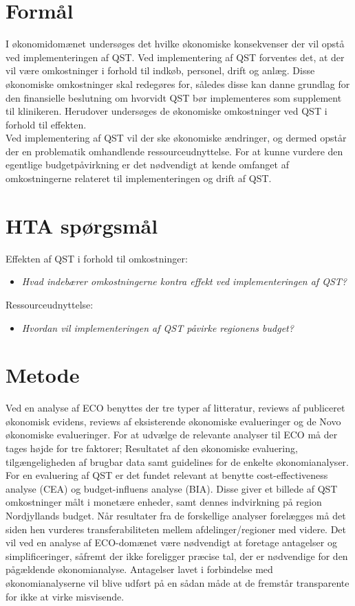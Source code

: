 \section{Formål}
I økonomidomænet undersøges det hvilke økonomiske konsekvenser der vil opstå ved implementeringen af QST. Ved implementering af QST forventes det, at der vil være omkostninger i forhold til indkøb, personel, drift og anlæg. Disse økonomiske omkostninger skal redegøres for, således disse kan danne grundlag for den finansielle beslutning om hvorvidt QST bør implementeres som supplement til klinikeren. Herudover undersøges de økonomiske omkostninger ved QST i forhold til effekten.\\ 
Ved implementering af  QST vil der ske økonomiske ændringer, og dermed opstår der en problematik omhandlende ressourceudnyttelse. For at kunne vurdere den egentlige budgetpåvirkning er det nødvendigt at kende omfanget af  omkostningerne relateret til implementeringen og drift af QST. 


\section{HTA spørgsmål}
Effekten af QST i forhold til omkostninger:
\begin{itemize}
	\item \textit{Hvad indebærer omkostningerne kontra effekt ved implementeringen af QST?} %
\end{itemize}


Ressourceudnyttelse:
\begin{itemize}
	\item \textit{Hvordan vil implementeringen af QST påvirke regionens budget?} %
\end{itemize}



\section{Metode}
Ved en analyse af ECO benyttes der tre typer af litteratur, reviews af publiceret økonomisk evidens, reviews af eksisterende økonomiske evalueringer og de Novo økonomiske evalueringer. For at udvælge de relevante analyser til ECO må der tages højde for tre faktorer; Resultatet af den økonomiske evaluering, tilgængeligheden af brugbar data samt guidelines for de enkelte økonomianalyser. For en evaluering af QST er det fundet relevant at benytte cost-effectiveness analyse (CEA) og budget-influens analyse (BIA). Disse giver et billede af QST omkostninger målt i monetære enheder, samt dennes indvirkning på region Nordjyllands budget. Når resultater fra de forskellige analyser forelægges må det siden hen vurderes transferabiliteten mellem afdelinger/regioner med videre. Det vil ved en analyse af ECO-domænet være nødvendigt at foretage antagelser og simplificeringer, såfremt der ikke foreligger præcise tal, der er nødvendige for den pågældende økonomianalyse. Antagelser lavet i forbindelse med økonomianalyserne vil blive udført på en sådan måde at de fremstår transparente for ikke at virke misvisende.

